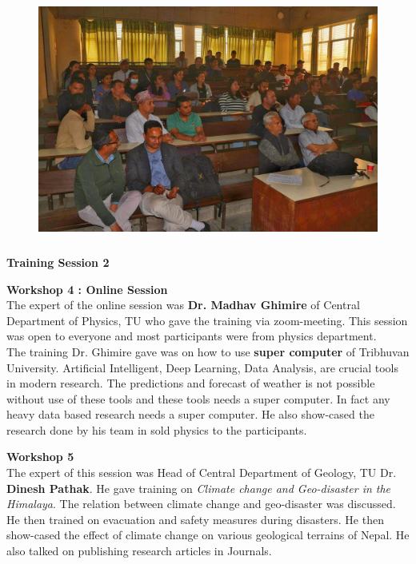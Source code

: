 \documentclass[a4paper,12pt]{report}
\begin{document}
\vspace{10mm}

\begin{figure}[h!]
  \centering
  \includegraphics[width=13cm, height=8cm]{r.jpeg}
\end{figure}
\clearpage

\begin{center}
  {\bfseries \Large Training Session 2}
\end{center}
\vspace{5mm}

{\bfseries \large Workshop 4 : Online Session}\\[3mm]
The expert of the online session was \textbf{Dr. Madhav Ghimire} of Central Department of Physics, TU who gave the training via zoom-meeting. This session was open to everyone and most participants were from physics department.\\[3mm]
The training Dr. Ghimire gave was on how to use \textbf{super computer} of Tribhuvan University. Artificial Intelligent, Deep Learning, Data Analysis, are crucial tools in modern research. The predictions and forecast of weather is not possible without use of these tools and these tools needs a super computer. In fact any heavy data based research needs a super computer. He also show-cased the research done by his team in sold physics to the participants.

\vspace{2cm}

{\bfseries \large Workshop 5}\\[3mm]
The expert of this session was Head of Central Department of Geology, TU Dr. \textbf{Dinesh Pathak}. He gave training on \textit{Climate change and Geo-disaster in the Himalaya}. The relation between climate change and geo-disaster was discussed. He then trained on evacuation and safety measures during disasters. He then show-cased the effect of climate change on various geological terrains of Nepal. He also talked on publishing research articles in Journals.
\end{document}
